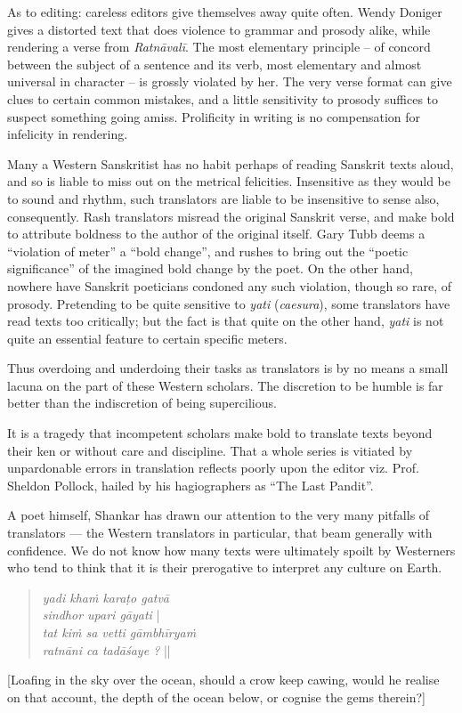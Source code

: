 As to editing: careless editors give themselves away quite often. Wendy Doniger gives a distorted text that does violence to grammar and prosody alike, while rendering a verse from \textsl{Ratnāvalī}. The most elementary principle -- of concord between the subject of a sentence and its verb, most elementary and almost universal in character -- is grossly violated by her. The very verse format can give clues to certain common mistakes, and a little sensitivity to prosody suffices to suspect something going amiss. Prolificity in writing is no compensation for infelicity in rendering.

Many a Western Sanskritist has no habit perhaps of reading Sanskrit texts aloud, and so is liable to miss out on the metrical felicities. Insensitive as they would be to sound and rhythm, such translators are liable to be insensitive to sense also, consequently. Rash translators misread the original Sanskrit verse, and make bold to attribute boldness to the author of the original itself. Gary Tubb deems a “violation of meter” a “bold change”, and rushes to bring out the “poetic significance” of the imagined bold change by the poet. On the other hand, nowhere have Sanskrit poeticians condoned any such violation, though so rare, of prosody. Pretending to be quite sensitive to \textsl{yati} (\textsl{caesura}), some translators have read texts too critically; but the fact is that quite on the other hand, \textsl{yati} is not quite an essential feature to certain specific meters.


Thus overdoing and underdoing their tasks as translators is by no means a small lacuna on the part of these Western scholars. The discretion to be humble is far better than the indiscretion of being supercilious.

It is a tragedy that incompetent scholars make bold to translate texts beyond their ken or without care and discipline. That a whole series is vitiated by unpardonable errors in translation reflects poorly upon the editor viz. Prof. Sheldon Pollock, hailed by his hagiographers as “The Last Pandit”.

A poet himself, Shankar has drawn our attention to the very many pitfalls of translators --- the Western translators in particular, that beam generally with confidence. We do not know how many texts were ultimately spoilt by Westerners who tend to think that it is their prerogative to interpret any culture on Earth.\\[-21pt]
\begin{quote}
\textsl{yadi khaṁ karaṭo gatvā}\\
\textsl{sindhor upari gāyati} |\\
\textsl{tat kiṁ sa vetti gāmbhīryaṁ}\\
\textsl{ratnāni ca tadāśaye ?} ||
\end{quote}
\vskip -5pt
[Loafing in the sky over the ocean, should a crow keep cawing, would he realise on that account, the depth of the ocean below, or cognise the gems therein?] 

